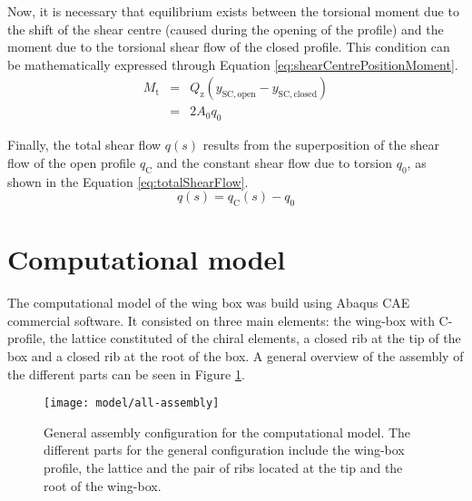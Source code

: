 Now, it is necessary that equilibrium exists between the torsional moment due to the shift of the shear centre (caused during the opening of the profile) and the moment due to the torsional shear flow of the closed profile. This condition can be mathematically expressed through Equation \ref{eq:shearCentrePositionMoment}.
%
\begin{eqnarray}\label{eq:shearCentrePositionMoment}
  M_\mathrm{t} &=& Q_\mathrm{z} (y_{\mathrm{SC,open}} - y_{\mathrm{SC,closed}}) \nonumber \\
  &=& 2 A_0 q_0
\end{eqnarray}
%

Finally, the total shear flow $q(s)$ results from the superposition of the shear flow of the open profile $q_\mathrm{C}$ and the constant shear flow due to torsion $q_0$, as shown in the Equation \ref{eq:totalShearFlow}.
%
\begin{equation}\label{eq:totalShearFlow}
  q(s) = q_\mathrm{C}(s) - q_0 %
\end{equation}

\section{Computational model} \label{sec:computationalModel}

%
The computational model of the wing box was build using Abaqus CAE commercial software. It consisted on three main elements: the wing-box with C-profile, the lattice constituted of the chiral elements, a closed rib at the tip of the box and a closed rib at the root of the box. A general overview of the assembly of the different parts can be seen in Figure \ref{fig:all-assembly}.

\begin{figure}[!htpb]
  \centering
  \texttt{[image: model/all-assembly]}
  \caption[General assembly configuration for the computational model]{General assembly configuration for the computational model. The different parts for the general configuration include the wing-box profile, the lattice and the pair of ribs located at the tip and the root of the wing-box.}\label{fig:all-assembly}
\end{figure}

